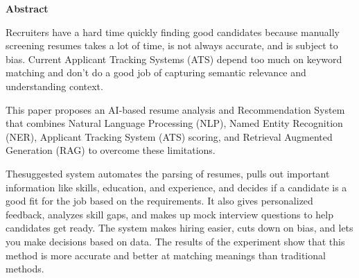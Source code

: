 \begin{center}
\LARGE
\textbf{Abstract}
\end{center}

{%
Recruiters have a hard time quickly finding good
candidates because manually screening resumes takes a lot of
time, is not always accurate, and is subject to bias. Current
Applicant Tracking Systems (ATS) depend too much on keyword
matching and don’t do a good job of capturing semantic relevance and understanding context.}

\vspace{6pt}
{%
This paper proposes an AI-based resume analysis and Recommendation System that combines
Natural Language Processing (NLP), Named Entity Recognition
(NER), Applicant Tracking System (ATS) scoring, and Retrieval
Augmented Generation (RAG) to overcome these limitations.}

\vspace{6pt}
{%
Thesuggested system automates the parsing of resumes, pulls out
important information like skills, education, and experience, and
decides if a candidate is a good fit for the job based on the
requirements. It also gives personalized feedback, analyzes skill
gaps, and makes up mock interview questions to help candidates
get ready. The system makes hiring easier, cuts down on bias,
and lets you make decisions based on data. The results of the
experiment show that this method is more accurate and better
at matching meanings than traditional methods.
}







